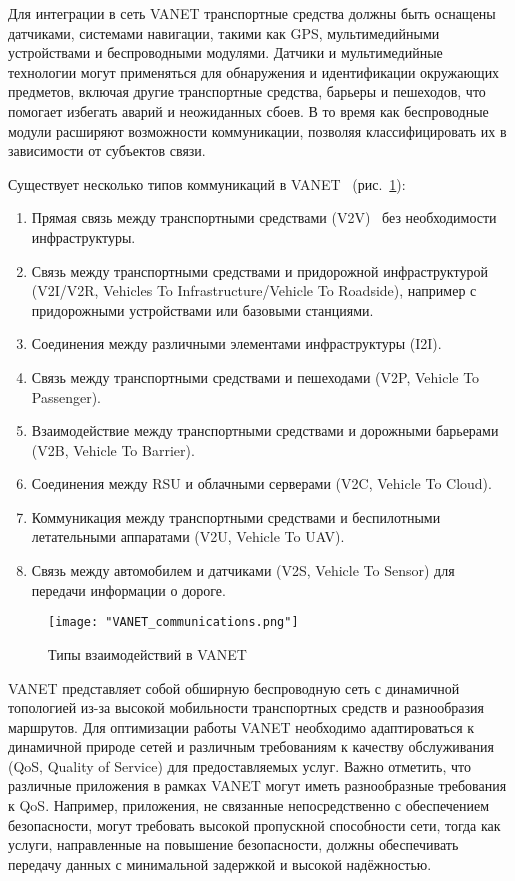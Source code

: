 Для интеграции в сеть VANET транспортные средства должны быть оснащены датчиками, системами навигации, такими как GPS, мультимедийными устройствами и беспроводными модулями. Датчики и мультимедийные технологии могут применяться для обнаружения и идентификации окружающих предметов, включая другие транспортные средства, барьеры и пешеходов, что помогает избегать аварий и неожиданных сбоев. В то время как беспроводные модули расширяют возможности коммуникации, позволяя классифицировать их в зависимости от субъектов связи.

Существует несколько типов коммуникаций в VANET~\cite{daniel2016cooperative} (рис.~\ref{fig:vanet_communications}):
\begin{enumerate}
    \item Прямая связь между транспортными средствами (V2V)~\cite{bintoro2021study} без необходимости инфраструктуры.
    \item Связь между транспортными средствами и придорожной инфраструктурой \linebreak(V2I/V2R, Vehicles To Infrastructure/Vehicle To Roadside), например с придорожными устройствами или базовыми станциями.
    \item Соединения между различными элементами инфраструктуры (I2I).
    \item Связь между транспортными средствами и пешеходами (V2P, Vehicle To Passenger).
    \item Взаимодействие между транспортными средствами и дорожными барьерами (V2B, Vehicle To Barrier).
    \item Соединения между RSU и облачными серверами (V2C, Vehicle To Cloud).
    \item Коммуникация между транспортными средствами и беспилотными летательными аппаратами (V2U, Vehicle To UAV).
    \item Связь между автомобилем и датчиками (V2S, Vehicle To Sensor) для передачи информации о дороге.
\end{enumerate}

\begin{figure}[!h]
    \centering
    \texttt{[image: "VANET\_communications.png"]}
    \caption{Типы взаимодействий в VANET}
    \label{fig:vanet_communications}
\end{figure}

VANET представляет собой обширную беспроводную сеть с динамичной топологией из-за высокой мобильности транспортных средств и разнообразия маршрутов. Для оптимизации работы VANET необходимо адаптироваться к динамичной природе сетей и различным требованиям к качеству обслуживания (QoS, Quality of Service) для предоставляемых услуг. Важно отметить, что различные приложения в рамках VANET могут иметь разнообразные требования к QoS. Например, приложения, не связанные непосредственно с обеспечением безопасности, могут требовать высокой пропускной способности сети, тогда как услуги, направленные на повышение безопасности, должны обеспечивать передачу данных с минимальной задержкой и высокой надёжностью.

